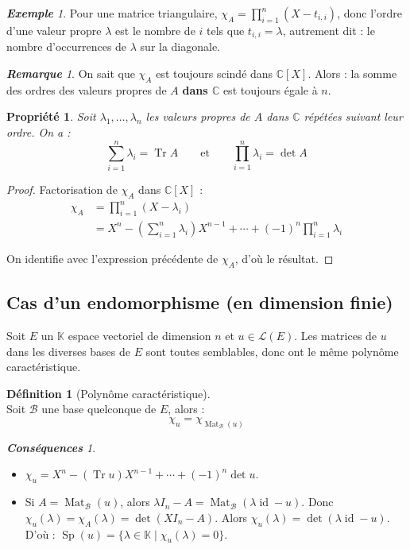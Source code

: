\documentclass[12pt]{book}
\let\ensembleNombre\mathbb
\newcommand*\C{\ensuremath{\ensembleNombre{C}}}
\newcommand*\K{\ensuremath{\ensembleNombre{K}}}
\DeclareMathOperator{\id}{id}
\DeclareMathOperator{\Sp}{Sp}
\DeclareMathOperator{\Tr}{Tr}
\DeclareMathOperator{\Mat}{Mat}
\newtheorem*{prop}{Propriété}
\theoremstyle{definition}
\newtheorem*{defi}{Définition}
\theoremstyle{remark}
\newtheorem*{conss}{\textbf{Conséquences}}
\newtheorem*{rem}{\textbf{Remarque}}
\newtheorem*{ex}{\textbf{Exemple}}
\newenvironment{fdef}
  {\begin{mdframed}[roundcorner=10pt, linewidth=1pt]\begin{defi}}
  {\end{defi}\end{mdframed}}
\begin{document}
	\begin{ex}
	Pour une matrice triangulaire, $\chi_A = \prod_{i=1}^n (X - t_{i,i})$, donc l'ordre d'une valeur propre $\lambda$ est le nombre de $i$ tels que $t_{i,i} = \lambda$, autrement dit : le nombre d'occurrences de $\lambda$ sur la diagonale.
	\end{ex}
	\begin{rem}
	On sait que $\chi_A$ est toujours scindé dans $\C[X]$. Alors : la somme des ordres des valeurs propres de $A$ \textbf{dans $\C$} est toujours égale à $n$.
	\end{rem}
	
	\begin{prop}
	Soit $\lambda_1, \ldots, \lambda_n$ les valeurs propres de $A$ dans $\C$ répétées suivant leur ordre. On a : 
	\[ \boxed{ \sum_{i=1}^n \lambda_i = \Tr A } \qquad \mathrm{ et } \qquad \boxed{ \prod_{i=1}^n \lambda_i = \det A }\]
	\end{prop}
	\begin{proof}
	Factorisation de $\chi_A$ dans $\C[X]$ : 
	\begin{align*}
	\chi_A &= \prod_{i=1}^n (X - \lambda_i) \\
	&= X^n - \left(\sum_{i=1}^n \lambda_i \right) X^{n-1} + \cdots + (-1)^n \prod_{i=1}^n \lambda _i
	\end{align*}
	
	On identifie avec l'expression précédente de $\chi_A$, d'où le résultat.
	\end{proof}
	
	\subsection{Cas d'un endomorphisme (en dimension finie)}
	Soit $E$ un $\K$ espace vectoriel de dimension $n$ et $u \in \mathcal L(E)$. Les matrices de $u$ dans les diverses bases de $E$ sont toutes semblables, donc ont le même polynôme caractéristique.
	
	\begin{fdef}[Polynôme caractéristique] \mbox{~}\\
	Soit $\mathcal B$ une base quelconque de $E$, alors :
	\[ \boxed{ \chi_u = \chi_{ \Mat_{\mathcal B}(u) }}\]
	\end{fdef}
	
	\begin{conss} \mbox{~}\\
		\begin{itemize}
		\item $\chi_u = X^n - (\Tr u)X^{n-1} + \cdots + (-1)^n \det u$.
		\item Si $A = \Mat_{\mathcal B}(u)$, alors $\lambda I_n - A = \Mat_{\mathcal B} (\lambda \id - u)$. Donc $\chi_u(\lambda) = \chi_A(\lambda) = \det (XI_n - A)$. Alors $\chi_u(\lambda) = \det(\lambda \id - u)$. D'où : $\Sp(u) = \lbrace \lambda \in \K \;|\; \chi_u(\lambda) = 0 \rbrace.$
		\end{itemize}
	\end{conss} \pagebreak
	
\end{document}
